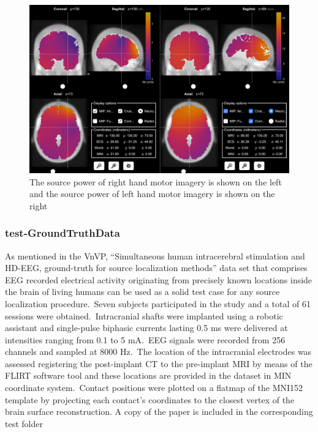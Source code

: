 \documentclass[12pt, titlepage]{article}
\begin{document}
\begin{figure}[H]
\centering
  \includegraphics[scale=0.4]{bci_brainstorm.png}
  \caption{The source power of right hand motor imagery is shown on the left and the source power of left hand motor imagery is shown on the right}
\label{Fig_bci}
\end{figure}

\subsubsection{test-GroundTruthData}
\label{test-GroundTruthData}

As mentioned in the VnVP, \enquote{Simultaneous human intracerebral stimulation and HD-EEG, ground-truth for source localization methods} data set that comprises EEG recorded electrical activity originating from precisely known locations inside the brain of living humans \cite{Mikulan2020} can be used as a solid test case for any source localization procedure.\ Seven subjects participated in the study and a total of 61 sessions were obtained.\ Intracranial shafts were implanted using a robotic assistant and single-pulse biphasic currents lasting 0.5 ms were delivered at intensities ranging from 0.1 to 5 mA.\ EEG signals were recorded from 256 channels and sampled at 8000 Hz.\ The location of the intracranial electrodes was assessed registering the post-implant CT to the pre-implant MRI by means of the FLIRT software tool and these locations are provided in the dataset in MIN coordinate system.\ Contact positions were plotted on a flatmap of the MNI152 template by projecting each contact’s coordinates to the closest vertex of the brain surface reconstruction. A copy of the paper is included in the corresponding test folder\\
\end{document}
